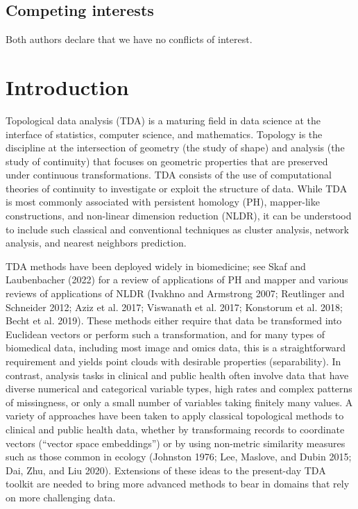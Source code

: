 \documentclass{article}
\begin{document}
\hypertarget{competing-interests}{%
\subsection*{Competing interests}\label{competing-interests}}

Both authors declare that we have no conflicts of interest.

\pagebreak

\hypertarget{introduction}{%
\section{Introduction}\label{introduction}}

Topological data analysis (TDA) is a maturing field in data science at
the interface of statistics, computer science, and mathematics. Topology
is the discipline at the intersection of geometry (the study of shape)
and analysis (the study of continuity) that focuses on geometric
properties that are preserved under continuous transformations. TDA
consists of the use of computational theories of continuity to
investigate or exploit the structure of data. While TDA is most commonly
associated with persistent homology (PH), mapper-like constructions, and
non-linear dimension reduction (NLDR), it can be understood to include
such classical and conventional techniques as cluster analysis, network
analysis, and nearest neighbors prediction.

TDA methods have been deployed widely in biomedicine; see Skaf and
Laubenbacher (2022) for a review of applications of PH and mapper and
various reviews of applications of NLDR (Ivakhno and Armstrong 2007;
Reutlinger and Schneider 2012; Aziz et al. 2017; Viswanath et al. 2017;
Konstorum et al. 2018; Becht et al. 2019). These methods either require
that data be transformed into Euclidean vectors or perform such a
transformation, and for many types of biomedical data, including most
image and omics data, this is a straightforward requirement and yields
point clouds with desirable properties (separability). In contrast,
analysis tasks in clinical and public health often involve data that
have diverse numerical and categorical variable types, high rates and
complex patterns of missingness, or only a small number of variables
taking finitely many values. A variety of approaches have been taken to
apply classical topological methods to clinical and public health data,
whether by transformaing records to coordinate vectors (``vector space
embeddings'') or by using non-metric similarity measures such as those
common in ecology (Johnston 1976; Lee, Maslove, and Dubin 2015; Dai,
Zhu, and Liu 2020). Extensions of these ideas to the present-day TDA
toolkit are needed to bring more advanced methods to bear in domains
that rely on more challenging data.
\end{document}
